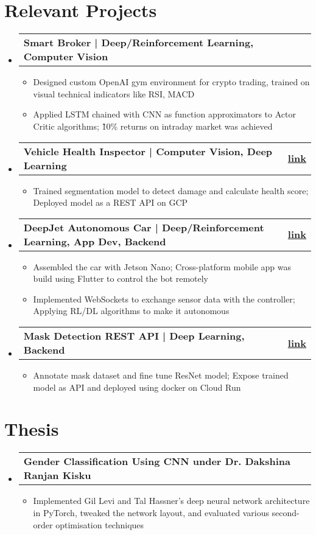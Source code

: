 \documentclass[letterpaper,10pt]{article}
\makeatletter
\newcommand{\resumeItemClean}[1]{
    \item\small{
        {#1 \vspace{-2pt}}
    }
}
\newcommand{\projectheading}[3]{
    \vspace{-1pt}\item
        \begin{tabular*}{0.97\textwidth}{l@{\extracolsep{\fill}}r}
            \textbf{#1} & \textbf{#2} #3\\
    \end{tabular*}\vspace{-5pt}
}
\newcommand{\resumeSubHeadingListStart}{\begin{itemize}[leftmargin=*]}
\newcommand{\resumeSubHeadingListEnd}{\end{itemize}}
\newcommand{\resumeItemListStart}{\begin{itemize}}
\newcommand{\resumeItemListEnd}{\end{itemize}\vspace{-5pt}}
\makeatother
\begin{document}
\section{Relevant Projects}
    \resumeSubHeadingListStart
        \projectheading{Smart Broker | Deep/Reinforcement Learning, Computer Vision}{}{}
            \resumeItemListStart
                \resumeItemClean
                    {Designed custom OpenAI gym environment for crypto trading, trained on visual technical indicators like RSI, MACD}
                \resumeItemClean
                    {Applied LSTM chained with CNN as function approximators to Actor Critic algorithms; \~10\% returns on intraday market was achieved}
            \resumeItemListEnd
        \projectheading{Vehicle Health Inspector | Computer Vision, Deep Learning}{\href{https://finddentsonmycar.tech/}{link}}{}
            \resumeItemListStart
                \resumeItemClean
                    {Trained segmentation model to detect damage and calculate health score; Deployed model as a REST API on GCP}
            \resumeItemListEnd
        \projectheading{DeepJet Autonomous Car | Deep/Reinforcement Learning, App Dev, Backend}{\href{https://github.com/vinaykudari/eureka-bot}{link}}{}
            \resumeItemListStart
                \resumeItemClean
                    {Assembled the car with Jetson Nano; Cross-platform mobile app was build using Flutter to control the bot remotely}
                \resumeItemClean
                    {Implemented WebSockets to exchange sensor data with the controller; Applying RL/DL algorithms to make it autonomous}
            \resumeItemListEnd
        \projectheading{Mask Detection REST API | Deep Learning, Backend}{\href{https://github.com/vinaykudari/mask-detection-api}{link}}{}
            \resumeItemListStart
                \resumeItemClean
                    {Annotate mask dataset and fine tune ResNet model; Expose trained model as API and deployed using docker on Cloud Run}
            \resumeItemListEnd
    \resumeSubHeadingListEnd
    
\section{Thesis}
\resumeSubHeadingListStart
\projectheading{Gender Classification Using CNN under Dr. Dakshina Ranjan Kisku}{}{}{}
            \resumeItemListStart
                \resumeItemClean
                    {Implemented Gil Levi and Tal Hassner's deep neural network architecture in PyTorch, tweaked the network layout, and evaluated various second-order optimisation techniques}
            \resumeItemListEnd
  \resumeSubHeadingListEnd
    
\end{document}
